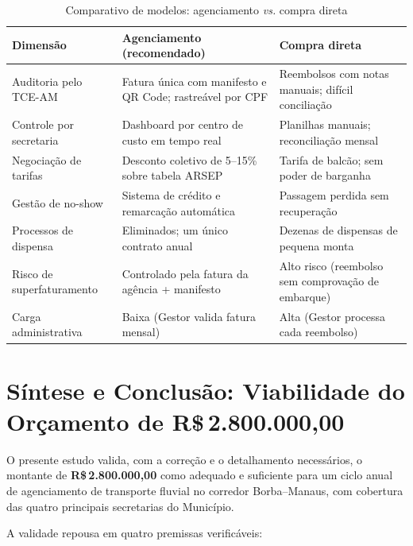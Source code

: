 \documentclass[12pt,a4paper]{article}
\newcommand{\Rs}{R\$\,}
\newcommand{\valorTotal}{2.800.000,00}
\begin{document}
\begin{table}[H]\centering
\caption{Comparativo de modelos: agenciamento \textit{vs.} compra direta}
\small{}
\begin{tabular}{L{4.5cm} L{4.5cm} L{4.5cm}}
  \color{white}\textbf{Dimensão} &
  \color{white}\textbf{Agenciamento (recomendado)} &
  \color{white}\textbf{Compra direta} \\
  \toprule
  Auditoria pelo TCE-AM &
    Fatura única com manifesto e QR Code; rastreável por CPF &
    Reembolsos com notas manuais; difícil conciliação \\
  Controle por secretaria &
    Dashboard por centro de custo em tempo real &
    Planilhas manuais; reconciliação mensal \\
  Negociação de tarifas &
    Desconto coletivo de 5--15\% sobre tabela ARSEP &
    Tarifa de balcão; sem poder de barganha \\
  Gestão de no-show &
    Sistema de crédito e remarcação automática &
    Passagem perdida sem recuperação \\
  Processos de dispensa &
    Eliminados; um único contrato anual &
    Dezenas de dispensas de pequena monta \\
  Risco de superfaturamento &
    Controlado pela fatura da agência + manifesto &
    Alto risco (reembolso sem comprovação de embarque) \\
  Carga administrativa &
    Baixa (Gestor valida fatura mensal) &
    Alta (Gestor processa cada reembolso) \\
  \bottomrule
\end{tabular}
\end{table}

\section{Síntese e Conclusão: Viabilidade do Orçamento de
  \Rs \valorTotal}

O presente estudo valida, com a correção e o detalhamento necessários, o
montante de \textbf{\Rs \valorTotal} como adequado e suficiente para um
ciclo anual de agenciamento de transporte fluvial no corredor Borba--Manaus,
com cobertura das quatro principais secretarias do Município.

A validade repousa em quatro premissas verificáveis:
\end{document}

